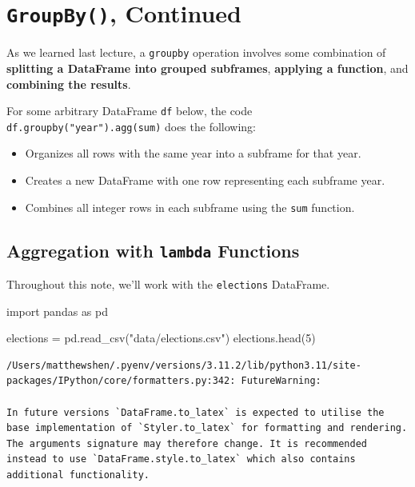 \documentclass[
  letterpaper,
  DIV=11,
  numbers=noendperiod]{scrreprt}
\newenvironment{Shaded}{\begin{snugshade}}{\end{snugshade}}
\newcommand{\DecValTok}[1]{\textcolor[rgb]{0.68,0.00,0.00}{#1}}
\newcommand{\ImportTok}[1]{\textcolor[rgb]{0.00,0.46,0.62}{#1}}
\newcommand{\NormalTok}[1]{\textcolor[rgb]{0.00,0.23,0.31}{#1}}
\newcommand{\OperatorTok}[1]{\textcolor[rgb]{0.37,0.37,0.37}{#1}}
\newcommand{\StringTok}[1]{\textcolor[rgb]{0.13,0.47,0.30}{#1}}
\providecommand{\tightlist}{%
  \setlength{\itemsep}{0pt}\setlength{\parskip}{0pt}}\usepackage{longtable,booktabs,array}
\begin{document}
\hypertarget{groupby-continued}{%
\section{\texorpdfstring{\texttt{GroupBy()},
Continued}{GroupBy(), Continued}}\label{groupby-continued}}

As we learned last lecture, a \texttt{groupby} operation involves some
combination of \textbf{splitting a DataFrame into grouped subframes},
\textbf{applying a function}, and \textbf{combining the results}.

For some arbitrary DataFrame \texttt{df} below, the code
\texttt{df.groupby("year").agg(sum)} does the following:

\begin{itemize}
\tightlist
\item
  Organizes all rows with the same year into a subframe for that year.
\item
  Creates a new DataFrame with one row representing each subframe year.
\item
  Combines all integer rows in each subframe using the \texttt{sum}
  function.
\end{itemize}

\hypertarget{aggregation-with-lambda-functions}{%
\subsection{\texorpdfstring{Aggregation with \texttt{lambda}
Functions}{Aggregation with lambda Functions}}\label{aggregation-with-lambda-functions}}

Throughout this note, we'll work with the \texttt{elections} DataFrame.

\begin{Shaded}
\begin{Highlighting}[]
\ImportTok{import}\NormalTok{ pandas }\ImportTok{as}\NormalTok{ pd}

\NormalTok{elections }\OperatorTok{=}\NormalTok{ pd.read\_csv(}\StringTok{"data/elections.csv"}\NormalTok{)}
\NormalTok{elections.head(}\DecValTok{5}\NormalTok{)}
\end{Highlighting}
\end{Shaded}

\begin{verbatim}
/Users/matthewshen/.pyenv/versions/3.11.2/lib/python3.11/site-packages/IPython/core/formatters.py:342: FutureWarning:

In future versions `DataFrame.to_latex` is expected to utilise the base implementation of `Styler.to_latex` for formatting and rendering. The arguments signature may therefore change. It is recommended instead to use `DataFrame.style.to_latex` which also contains additional functionality.
\end{verbatim}
\end{document}
